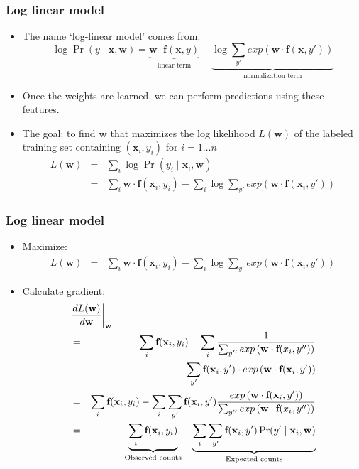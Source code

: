 \begin{frame}
\frametitle{Log linear model}
\begin{itemize}[<+->]
\item The name `log-linear model' comes from:
\[ \log \Pr(y \mid \textbf{x}, \textbf{w}) = \underbrace{\textbf{w} \cdot \textbf{f}(\textbf{x}, y)}_{\textrm{linear term}} - \underbrace{\log \sum_{y'} exp\left( \textbf{w} \cdot \textbf{f}(\textbf{x}, y') \right)}_{\textrm{normalization term}} \]
\item Once the weights are learned, we can perform predictions using these features.
\item The goal: to find $\textbf{w}$ that maximizes the log likelihood $L(\textbf{w})$ of the labeled training set containing $(\textbf{x}_i, y_i)$ for $i = 1 \ldots n$
\begin{eqnarray*}
L(\textbf{w}) &=& \sum_{i} \log \Pr(y_i \mid \textbf{x}_i, \textbf{w}) \\
&=& \sum_i \textbf{w} \cdot \textbf{f}(\textbf{x}_i, y_i) - \sum_i \log \sum_{y'} exp\left( \textbf{w} \cdot \textbf{f}(\textbf{x}_i, y') \right) 
\end{eqnarray*}
\end{itemize}
\end{frame}

\begin{frame}
\frametitle{Log linear model}
\begin{itemize}[<+->]
\item Maximize:
\begin{eqnarray*}
L(\textbf{w}) &=& \sum_i \textbf{w} \cdot \textbf{f}(\textbf{x}_i, y_i) - \sum_i \log \sum_{y'} exp\left( \textbf{w} \cdot \textbf{f}(\textbf{x}_i, y') \right) 
\end{eqnarray*}
\item Calculate gradient:
\begin{eqnarray*}
\lefteqn{\left. \frac{d L(\textbf{w})}{d \textbf{w}} \right|_{\textbf{w}} } \\
&=& \sum_i \textbf{f}(\textbf{x}_i, y_i) - \sum_i \frac{1}{\sum_{y''} exp\left(\textbf{w} \cdot \textbf{f}(x_i, y'')\right)} \\
&& \sum_{y'} \textbf{f}(\textbf{x}_i, y')  \cdot exp\left( \textbf{w} \cdot \textbf{f}(\textbf{x}_i, y') \right) \\
&=& \sum_i \textbf{f}(\textbf{x}_i, y_i) - \sum_i \sum_{y'} \textbf{f}(\textbf{x}_i, y') \frac{exp\left( \textbf{w} \cdot \textbf{f}(\textbf{x}_i, y') \right)}{\sum_{y''} exp\left(\textbf{w} \cdot \textbf{f}(x_i, y'')\right)} \\
&=& \underbrace{\sum_i \textbf{f}(\textbf{x}_i, y_i)}_{\textrm{Observed counts}} - \underbrace{\sum_i \sum_{y'} \textbf{f}(\textbf{x}_i, y') \Pr(y' \mid \textbf{x}_i, \textbf{w})}_{\textrm{Expected counts}}
\end{eqnarray*}
\end{itemize}
\end{frame}

